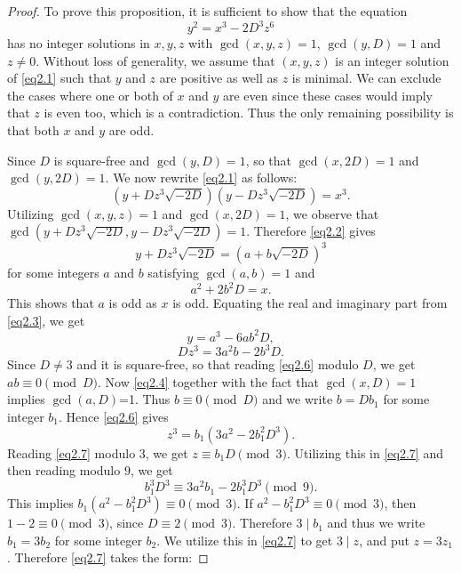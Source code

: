 \documentclass[10pt,a4paper]{amsart}
\begin{document}
\begin{proof}
To prove this proposition, it is sufficient to show that the equation 
\begin{equation}\label{eq2.1}
y^2=x^3-2D^3z^6
\end{equation}
has no integer solutions in $x,y,z$ with $\gcd(x, y, z)=1$, $\gcd(y,D)=1$ and $z\ne 0$. Without loss of generality, we assume that $(x,y,z)$ is an integer solution of \eqref{eq2.1} such that $y$ and $z$ are positive as well as $z$ is minimal. We can exclude the cases where one or both of $x$ and $y$ are even since these cases would imply that $z$ is even too, which is a contradiction. Thus the only remaining possibility is that both $x$ and $y$ are odd.

Since $D$ is square-free and $\gcd(y,D)=1$, so that $\gcd(x,2D)=1$ and $\gcd(y,2D)=1$. 
We now rewrite \eqref{eq2.1} as follows:
\begin{equation}\label{eq2.2}
\left(y+Dz^3\sqrt{-2D}\right)\left(y-Dz^3\sqrt{-2D}\right)=x^3.
\end{equation} 
Utilizing $\gcd(x,y,z)=1$ and $\gcd(x,2D)=1$, we observe that $\gcd(y+Dz^3\sqrt{-2D}, y-Dz^3\sqrt{-2D})=1$. 
Therefore \eqref{eq2.2} gives 
\begin{equation}\label{eq2.3}
y+Dz^3\sqrt{-2D}=\left(a+b\sqrt{-2D}\right)^3
\end{equation}
for some integers $a$ and $b$ satisfying $\gcd(a,b)=1$ and 
\begin{equation}\label{eq2.4}
a^2+2b^2D=x.
\end{equation}
This shows that $a$ is odd as $x$ is odd. 
Equating the real and imaginary part from \eqref{eq2.3}, we get
\begin{equation}\label{eq2.5}
y=a^3-6ab^2D,
\end{equation}
\begin{equation}\label{eq2.6}
Dz^3=3a^2b-2b^3D.
\end{equation}
Since $D\ne 3$ and it is square-free, so that reading \eqref{eq2.6} modulo $D$, we get $ab\equiv 0\pmod D$. Now \eqref{eq2.4} together with the fact that $\gcd(x,D)=1$ implies $\gcd(a, D)$=1. Thus $b\equiv 0\pmod D$ and we write $b=Db_1$ for some integer $b_1$. Hence \eqref{eq2.6} gives
\begin{equation}\label{eq2.7}
z^3=b_1(3a^2-2b_1^2D^3).
\end{equation}
Reading \eqref{eq2.7} modulo $3$, we get $z\equiv b_1D\pmod 3$.
Utilizing this in \eqref{eq2.7} and then reading modulo $9$, we get
$$b_1^3D^3\equiv 3a^2b_1-2b_1^3D^3\pmod 9.$$
This implies $b_1(a^2-b_1^2D^3)\equiv 0\pmod 3$. If $a^2-b_1^2D^3\equiv 0\pmod 3$, then $1-2\equiv 0 \pmod 3$, since $D\equiv 2\pmod 3$.  Therefore $3\mid b_1$ and thus we write $b_1=3b_2$ for some integer $b_2$. We utilize this in \eqref{eq2.7} to get $3\mid z$, and put $z=3z_1$. Therefore \eqref{eq2.7} takes the form:

\end{proof}
\end{document}
